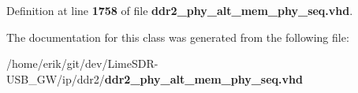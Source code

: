 Definition at line {\bf 1758} of file {\bf ddr2\+\_\+phy\+\_\+alt\+\_\+mem\+\_\+phy\+\_\+seq.\+vhd}.



The documentation for this class was generated from the following file\+:\begin{DoxyCompactItemize}
\item 
/home/erik/git/dev/\+Lime\+S\+D\+R-\/\+U\+S\+B\+\_\+\+G\+W/ip/ddr2/{\bf ddr2\+\_\+phy\+\_\+alt\+\_\+mem\+\_\+phy\+\_\+seq.\+vhd}\end{DoxyCompactItemize}
